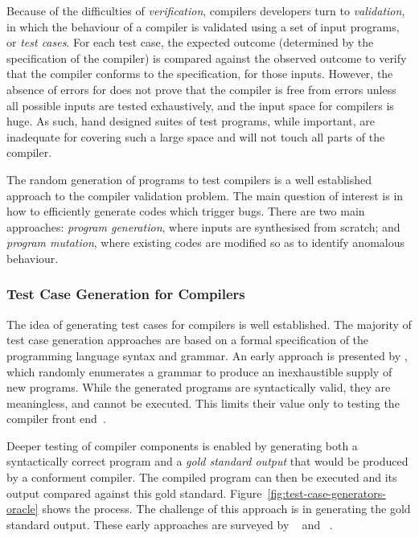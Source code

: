 Because of the difficulties of \emph{verification}, compilers developers turn to \emph{validation}, in which the behaviour of a compiler is validated using a set of input programs, or \emph{test cases}. For each test case, the expected outcome (determined by the specification of the compiler) is compared against the observed outcome to verify that the compiler conforms to the specification, for those inputs. However, the absence of errors for does not prove that the compiler is free from errors unless all possible inputs are tested exhaustively, and the input space for compilers is huge. As such, hand designed suites of test programs, while important, are inadequate for covering such a large space and will not touch all parts of the compiler.

The random generation of programs to test compilers is a well established approach to the compiler validation problem. The main question of interest is in how to efficiently generate codes which trigger bugs. There are two main approaches: \emph{program generation}, where inputs are synthesised from scratch; and \emph{program mutation}, where existing codes are modified so as to identify anomalous behaviour.


\subsubsection{Test Case Generation for Compilers}

The idea of generating test cases for compilers is well established. The majority of test case generation approaches are based on a formal specification of the programming language syntax and grammar.
An early approach is presented by \citeauthor{Hanford1970a}, which randomly enumerates a grammar to produce an inexhaustible supply of new programs. While the generated programs are syntactically valid, they are meaningless, and cannot be executed. This limits their value only to testing the compiler front end~\cite{Hanford1970a}.

Deeper testing of compiler components is enabled by generating both a syntactically correct program and a \emph{gold standard output} that would be produced by a conforment compiler. The compiled program can then be executed and its output compared against this gold standard. Figure~\ref{fig:test-case-generators-oracle} shows the process. The challenge of this approach is in generating the gold standard output. These early approaches are surveyed by \citeauthor{Boujarwah1997}~\cite{Boujarwah1997} and \citeauthor{Kossatchev2005}~\cite{Kossatchev2005}.

